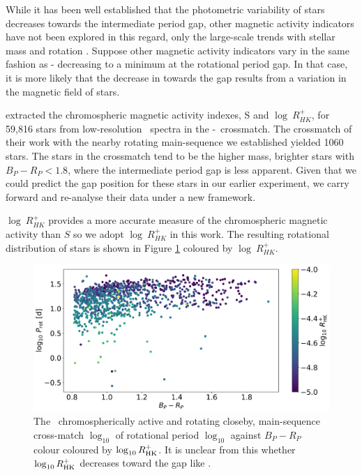 While it has been well established that the photometric variability of stars decreases towards the intermediate period gap, other magnetic activity indicators have not been explored in this regard, only the large-scale trends with stellar mass and rotation \citep{zhang_magnetic_2020}.
Suppose other magnetic activity indicators vary in the same fashion as \rper{} - decreasing to a minimum at the rotational period gap. 
In that case, it is more likely that the decrease in \rper{} towards the gap results from a variation in the magnetic field of stars.

\citet{zhang_magnetic_2020} extracted the chromospheric magnetic activity indexes, S and $\log \ R^{+}_{HK}$, for 59,816 stars from low-resolution \lamost\ spectra in the \kepler-\lamost\ crossmatch.
The crossmatch of their work with the nearby rotating main-sequence we established yielded 1060 stars.
The stars in the crossmatch tend to be the higher mass, brighter stars with $B_P-R_P<1.8$, where the intermediate period gap is less apparent.
Given that we could predict the gap position for these stars in our earlier experiment, we carry forward and re-analyse their data under a new framework.

$\log \ R^{+}_{HK}$ provides a more accurate measure of the chromospheric magnetic activity than $S$ so we adopt $\log \ R^{+}_{HK}$ in this work.
The resulting rotational distribution of stars is shown in Figure \ref{fig:rot_dist_rhk} coloured by $\log \ R^{+}_{HK}$.

\begin{figure}
\centering
  \includegraphics[width=\textwidth]{Figures/rot_gap_figures/rotational_dist_rhk.png}
  \caption[The \lamost\ chromospherically active and \kepler{} rotating closeby, main-sequence cross-match $\log_{10}$ of rotational period $\log_{10}$ against \gaia $B_P-R_P$ colour coloured by $\log_{10}R^{+}_{\rm{HK}}$.]{
  The \lamost\ chromospherically active and \kepler{} rotating closeby, main-sequence cross-match $\log_{10}$ of rotational period $\log_{10}$ against \gaia $B_P-R_P$ colour coloured by $\log_{10}R^{+}_{\rm{HK}}$. It is unclear from this whether $\log_{10}R^{+}_{\rm{HK}}$ decreases toward the gap like \rper{}.}
  \label{fig:rot_dist_rhk}
\end{figure}

